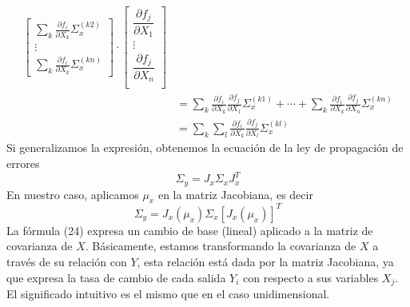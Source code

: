 \documentclass[a4paper, 10pt]{article}
\begin{document}
\begin{equation}
\begin{split}
\begin{bmatrix}
            \sum_{k} {\frac{\partial f_i}{\partial X_k}\Sigma_x^{(k2)}}\\
            \vdots \\
            \sum_{k} {\frac{\partial f_i}{\partial X_k}\Sigma_x^{(kn)}}        
        \end{bmatrix}\cdot
        \begin{bmatrix}
            \dfrac{\partial f_j}{\partial X_1} \\
            \vdots                             \\
            \dfrac{\partial f_j}{\partial X_n} \\
        \end{bmatrix}\\[1em]
        &=\sum_{k} {\frac{\partial f_i}{\partial X_k}\frac{\partial f_j}{\partial X_1}\Sigma_x^{(k1)}} + \cdots + \sum_{k} {\frac{\partial f_i}{\partial X_k}\frac{\partial f_j}{\partial X_n}\Sigma_x^{(kn)}}\\[1em]
        &=\sum_{k}\sum_{l}{\frac{\partial f_i}{\partial X_k}\frac{\partial f_j}{\partial X_l}\Sigma_x^{(kl)}}
    \end{split}
\end{equation}
Si generalizamos la expresión, obtenemos la ecuación de la ley de propagación de errores
\begin{equation}
    \Sigma_y = J_x \Sigma_x J_x^{T}
\end{equation}
En nuestro caso, aplicamos $\mu_x$ en la matriz Jacobiana, es decir
\begin{equation}
    \Sigma_y = J_x(\mu_x) \Sigma_x \left[J_x(\mu_x)\right]^{T}
\end{equation}
La fórmula (24) expresa un cambio de base (lineal) aplicado a la matriz de covarianza de $X$. Básicamente, estamos transformando la covarianza de $X$ a
través de su relación con $Y$, esta relación está dada por la matriz Jacobiana, ya que expresa la tasa de cambio de cada salida $Y_i$ con respecto a sus
variables $X_j$. El significado intuitivo es el mismo que en el caso unidimensional.
\end{document}
